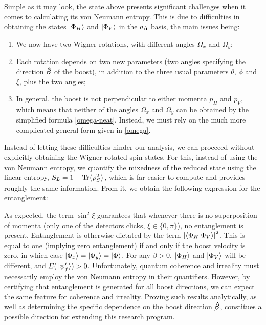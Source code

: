 \documentclass[12pt,a4paper,notitlepage]{report}
\begin{document}

Simple as it may look, the state above presents significant challenges when it comes to calculating its von Neumann entropy. This is due to difficulties in obtaining the states $\ket{\Phi_H}$ and $\ket{\Phi_V}$ in the $\sigma_{\vu{n}}$ basis, the main issues being:

\begin{enumerate}

\item We now have two Wigner rotations, with different angles $\Omega_x$ and $\Omega_y$;

\item Each rotation depends on two new parameters (two angles specifying the direction $\vu*{\beta}$ of the boost), in addition to the three usual parameters $\theta$, $\phi$ and $\xi$, plus the two angles;

\item In general, the boost is not perpendicular to either momenta $p_H$ and $p_V$, which means that neither of the angles $\Omega_x$ and $\Omega_y$ can be obtained by the simplified formula \eqref{omega-neat}. Instead, we must rely on the much more complicated general form given in \eqref{omega}.

\end{enumerate}

Instead of letting these difficulties hinder our analysis, we can procceed without explicitly obtaining the Wigner-rotated spin states. For this, instead of using the von Neumann entropy, we quantify the mixedness of the reduced state using the linear entropy, $S_L = 1 - \Tr(\rho_S^2)$, which is far easier to compute and provides roughly the same information. From it, we obtain the following expression for the entanglement:

%
As expected, the term $\sin^2\xi$ guarantees that whenever there is no superposition of momenta (only one of the detectors clicks, $\xi \in \{0 , \pi \}$), no entanglement is present. Entanglement is otherwise dictated by the term $\left|\bra{\Phi_H}\ket{\Phi_V}\right|^2$. This is equal to one (implying zero entanglement) if and only if the boost velocity is zero, in which case $\ket{\Phi_x} = \ket{\Phi_y} = \ket{\Phi}$. For any $\beta > 0$, $\ket{\Phi_H}$ and $\ket{\Phi_V}$ will be different, and $E(\ket*{\psi'_f}) > 0$. Unfortunately, quantum coherence and irreality must necessarily employ the von Neumann entropy in their quantifiers. However, by certifying that entanglement is generated for all boost directions, we can expect the same feature for coherence and irreality. Proving such results analytically, as well as determining the specific dependence on the boost direction $\vu*{\beta}$, constitues a possible direction for extending this research program.
\end{document}
